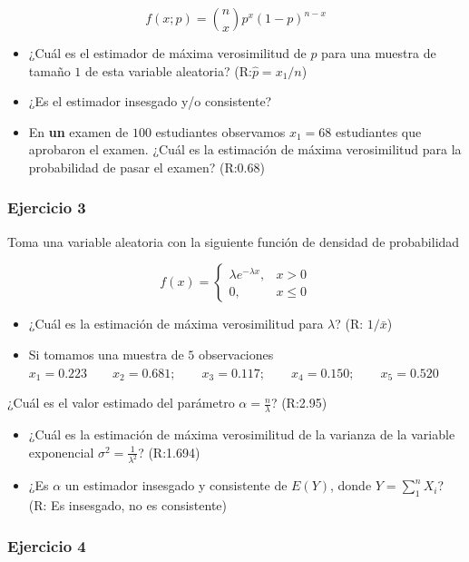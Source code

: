\documentclass[
]{book}
\begin{document}
\[f(x; p)=\binom nxp^x(1-p)^{n-x}\]

\begin{itemize}
\item
  ¿Cuál es el estimador de máxima verosimilitud de \(p\) para una muestra de tamaño \(1\) de esta variable aleatoria? (R:\(\hat{p}=x_1/n\))
\item
  ¿Es el estimador insesgado y/o consistente?
\item
  En \textbf{un} examen de \(100\) estudiantes observamos \(x_1=68\) estudiantes que aprobaron el examen. ¿Cuál es la estimación de máxima verosimilitud para la probabilidad de pasar el examen? (R:0.68)
\end{itemize}

\hypertarget{ejercicio-3-6}{%
\subsubsection{Ejercicio 3}\label{ejercicio-3-6}}

Toma una variable aleatoria con la siguiente función de densidad de probabilidad

\[
    f(x)= 
\begin{cases}
    \lambda e^{-\lambda x},&  x > 0 \\
    0,& x\leq 0  
\end{cases}
\]

\begin{itemize}
\item
  ¿Cuál es la estimación de máxima verosimilitud para \(\lambda\)? (R: \(1/\bar{x}\))
\item
  Si tomamos una muestra de \(5\) observaciones
  \(x_1 = 0.223 \qquad x_2 = 0.681; \qquad x_3 = 0.117; \qquad x_4 = 0.150; \qquad x_5 = 0.520\)
\end{itemize}

¿Cuál es el valor estimado del parámetro \(\alpha=\frac{n}{\lambda}\)? (R:2.95)

\begin{itemize}
\item
  ¿Cuál es la estimación de máxima verosimilitud de la varianza de la variable exponencial \(\sigma^2=\frac{1}{\lambda^2}\)? (R:1.694)
\item
  ¿Es \(\alpha\) un estimador insesgado y consistente de \(E(Y)\), donde \(Y=\sum_1^n X_i\)? (R: Es insesgado, no es consistente)
\end{itemize}

\hypertarget{ejercicio-4-4}{%
\subsubsection{Ejercicio 4}\label{ejercicio-4-4}}
\end{document}
